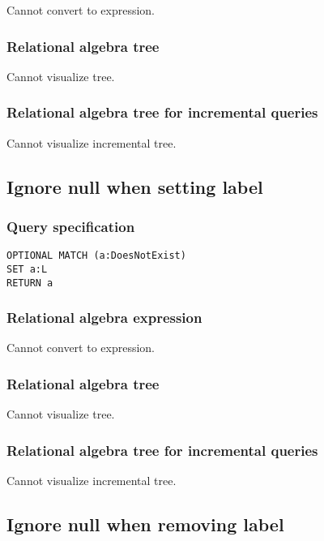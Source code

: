 Cannot convert to expression.

\subsubsection*{Relational algebra tree}

Cannot visualize tree.

\subsubsection*{Relational algebra tree for incremental queries}

Cannot visualize incremental tree.

\subsection{Ignore null when setting label}

\subsubsection*{Query specification}

\begin{lstlisting}
OPTIONAL MATCH (a:DoesNotExist)
SET a:L
RETURN a
\end{lstlisting}

\subsubsection*{Relational algebra expression}

Cannot convert to expression.

\subsubsection*{Relational algebra tree}

Cannot visualize tree.

\subsubsection*{Relational algebra tree for incremental queries}

Cannot visualize incremental tree.

\subsection{Ignore null when removing label}

